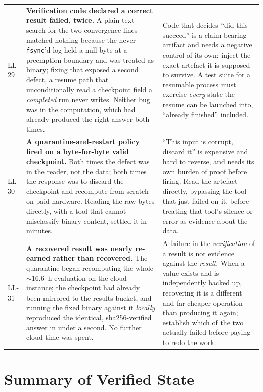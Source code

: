 \documentclass[11pt,a4paper]{article}
\theoremstyle{definition}
\theoremstyle{plain}
\begin{document}
\begin{longtable}{@{}p{1.1cm}p{6.3cm}p{7.0cm}@{}}
\addlinespace
LL-29 & \textbf{Verification code declared a correct result failed, twice.} A plain text search for the two convergence lines matched nothing because the never-\texttt{fsync}'d log held a null byte at a preemption boundary and was treated as binary; fixing that exposed a second defect, a resume path that unconditionally read a checkpoint field a \emph{completed} run never writes. Neither bug was in the computation, which had already produced the right answer both times. & Code that decides ``did this succeed'' is a claim-bearing artifact and needs a negative control of its own: inject the exact artefact it is supposed to survive. A test suite for a resumable process must exercise \emph{every} state the resume can be launched into, ``already finished'' included. \\
\addlinespace
LL-30 & \textbf{A quarantine-and-restart policy fired on a byte-for-byte valid checkpoint.} Both times the defect was in the reader, not the data; both times the response was to discard the checkpoint and recompute from scratch on paid hardware. Reading the raw bytes directly, with a tool that cannot misclassify binary content, settled it in minutes. & ``This input is corrupt, discard it'' is expensive and hard to reverse, and needs its own burden of proof before firing. Read the artefact directly, bypassing the tool that just failed on it, before treating that tool's silence or error as evidence about the data. \\
\addlinespace
LL-31 & \textbf{A recovered result was nearly re-earned rather than recovered.} The quarantine began recomputing the whole ${\sim}16.6$~h evaluation on the cloud instance; the checkpoint had already been mirrored to the results bucket, and running the fixed binary against it \emph{locally} reproduced the identical, sha256-verified answer in under a second. No further cloud time was spent. & A failure in the \emph{verification} of a result is not evidence against the \emph{result}. When a value exists and is independently backed up, recovering it is a different and far cheaper operation than producing it again; establish which of the two actually failed before paying to redo the work. \\
\bottomrule
\end{longtable}

\section{Summary of Verified State}
\label{sec:summary}
\end{document}
